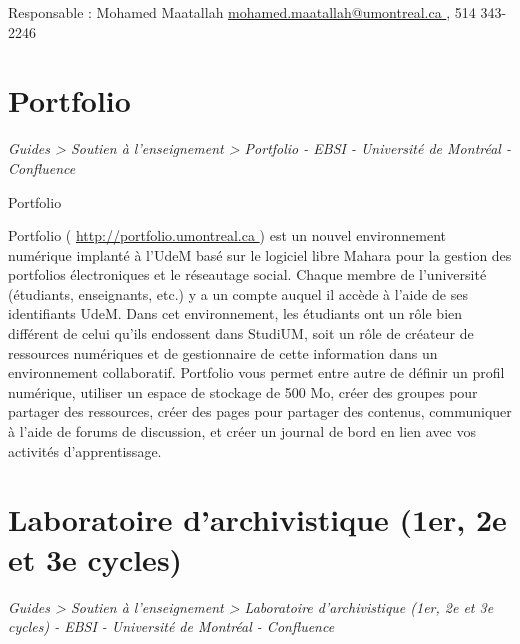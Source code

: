 \documentclass [12 pt]{article}
\begin{document}
            
                Responsable : Mohamed Maatallah
        \href{
        mailto:mohamed.maatallah@umontreal.ca
        } {
        mohamed.maatallah@umontreal.ca
        }
    , 514 343-2246
            
        
    
    
        \newpage
        \section {
        Portfolio
        }
        
        
        
        \textit{
        Guides > Soutien à l'enseignement > Portfolio - EBSI - Université de
            Montréal - Confluence
        }
    
        Portfolio
        
            Portfolio (
        \href{
        http://portfolio.umontreal.ca/
        } {
        http://portfolio.umontreal.ca
        }
    ) est un nouvel environnement
                numérique implanté à l'UdeM basé sur le logiciel libre Mahara pour la gestion des
                portfolios électroniques et le réseautage social. Chaque membre de l'université
                (étudiants, enseignants, etc.) y a un compte auquel il accède à l'aide de ses
                identifiants UdeM. Dans cet environnement, les étudiants ont un rôle bien différent
                de celui qu'ils endossent dans StudiUM, soit un rôle de créateur de ressources
                numériques et de gestionnaire de cette information dans un environnement
                collaboratif. Portfolio vous permet entre autre de définir un profil numérique,
                utiliser un espace de stockage de 500 Mo, créer des groupes pour partager des
                ressources, créer des pages pour partager des contenus, communiquer à l'aide de
                forums de discussion, et créer un journal de bord en lien avec vos activités
                d'apprentissage.
        
    
    
        \newpage
        \section {
        Laboratoire d'archivistique (1er, 2e et 3e cycles)
        }
        
        
        
        \textit{
        Guides > Soutien à l'enseignement > Laboratoire d'archivistique (1er,
            2e et 3e cycles) - EBSI - Université de Montréal - Confluence
        }
    
\end{document}
